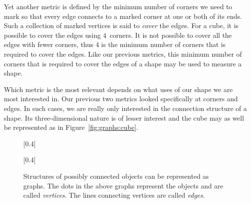 Yet another metric is defined by the minimum number of corners we need to mark so that every edge connects to a marked corner at one or both of its ends.
Such a collection of marked vertices is said to \emph{cover} the edges.
For a cube, it is possible to cover the edges using $4$~corners.
It is not possible to cover all the edges with fewer corners, thus $4$ is the minimum number of corners that is required to cover the edges.
Like our previous metrics, this minimum number of corners that is required to cover the edges of a shape may be used to measure a shape.

Which metric is the most relevant depends on what uses of our shape we are most interested in.
Our previous two metrics looked specifically at corners and edges.
In such cases, we are really only interested in the connection structure of a shape.
Its three-dimensional nature is of lesser interest and the cube may as well be represented as in Figure~\ref{fig:graphs:cube}.

\begin{figure}
  \centering
  [0.4\textwidth]{
  }
  \qquad
  [0.4\textwidth]{
  }
  \caption{
    Structures of possibly connected objects can be represented as graphs.
    The dots in the above graphs represent the objects and are called \emph{vertices}.
    The lines connecting vertices are called \emph{edges}.
  }
\end{figure}

